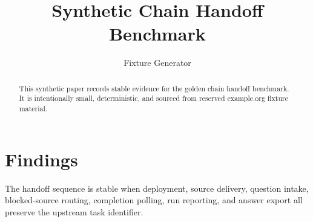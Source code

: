 \documentclass{article}
\title{Synthetic Chain Handoff Benchmark}
\author{Fixture Generator}
\begin{document}
\maketitle
\begin{abstract}
This synthetic paper records stable evidence for the golden chain handoff
benchmark. It is intentionally small, deterministic, and sourced from
reserved example.org fixture material.
\end{abstract}
\section{Findings}
The handoff sequence is stable when deployment, source delivery, question
intake, blocked-source routing, completion polling, run reporting, and answer
export all preserve the upstream task identifier.
\end{document}
